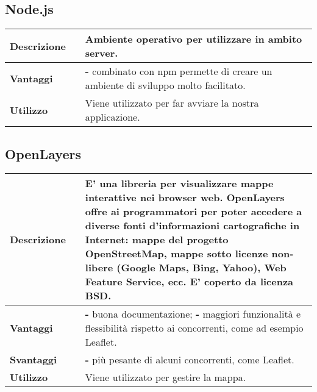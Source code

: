 \vspace{40px}
\subsection{Node.js}
\label{Node.js}
\begin{table}[H]
	\centering
	\begin{tabular}{p{2cm}p{0.5cm}p{11.5cm}}
		\arrayrulecolor{lightgray}
		\toprule
		\textbf{Descrizione} & &
		Ambiente operativo per utilizzare \js{} in ambito server.
		\\ \midrule
		\textbf{Vantaggi} & &
		\textbf{- }combinato con npm permette di creare un ambiente di sviluppo molto facilitato.
		\\ \midrule
		\textbf{Utilizzo} & &
		Viene utilizzato per far avviare la nostra applicazione.
		\\ \bottomrule
	\end{tabular}
\end{table}

\vspace{40px}
\subsection{OpenLayers}
\label{OpenLayers}
\begin{table}[H]
	\centering
	\begin{tabular}{p{2cm}p{0.5cm}p{11.5cm}}
		\arrayrulecolor{lightgray}
		\toprule
		\textbf{Descrizione} & &
		E' una libreria \js{} per visualizzare mappe interattive nei browser web.
		OpenLayers offre \glo{API}{API} ai programmatori per poter accedere a diverse fonti d'informazioni cartografiche in Internet: mappe del progetto OpenStreetMap, mappe sotto licenze non-libere (Google Maps, Bing, Yahoo), Web Feature Service, ecc. E' coperto da licenza BSD.
		\\ \midrule
		\textbf{Vantaggi} & &
		\textbf{- }buona documentazione;
		\newline
		\textbf{- }maggiori funzionalità e flessibilità rispetto ai concorrenti, come ad esempio Leaflet.
		\\ \midrule
		\textbf{Svantaggi} & &
		\textbf{- }più pesante di alcuni concorrenti, come Leaflet.
		\\ \midrule
		\textbf{Utilizzo} & &
		Viene utilizzato per gestire la mappa.
		\\ \bottomrule
	\end{tabular}
\end{table}





